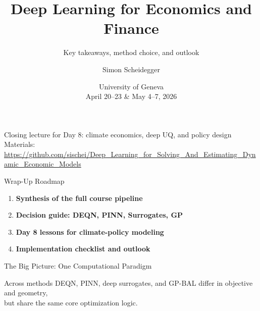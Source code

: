 \documentclass[aspectratio=169,11pt]{beamer}
\title[Deep Learning -- Geneva 2026]%
{Deep Learning for Economics and Finance}
\subtitle{Key takeaways, method choice, and outlook}
\author{Simon Scheidegger}
\institute[HEC Lausanne]{HEC, University of Lausanne}
\date{University of Geneva\\April 20--23 \& May 4--7, 2026}
\begin{document}
{
\begin{frame}
\titlepage
\vspace{-0.4cm}
\begin{center}
{\footnotesize Closing lecture for Day 8: climate economics, deep UQ, and policy design}\\[4pt]
{\footnotesize Materials: \url{https://github.com/sischei/Deep_Learning_for_Solving_And_Estimating_Dynamic_Economic_Models}}
\end{center}
\end{frame}
}

\begin{frame}{Wrap-Up Roadmap}
\begin{enumerate}
    \item \textbf{Synthesis of the full course pipeline}
    \item \textbf{Decision guide: DEQN, PINN, Surrogates, GP}
    \item \textbf{Day 8 lessons for climate-policy modeling}
    \item \textbf{Implementation checklist and outlook}
\end{enumerate}
\end{frame}

\begin{frame}{The Big Picture: One Computational Paradigm}
\begin{center}
\end{center}

\vspace{0.25cm}
\begin{block}{Across methods}
DEQN, PINN, deep surrogates, and GP-BAL differ in objective and geometry,\\
but share the same core optimization logic.
\end{block}
\end{frame}
\end{document}
